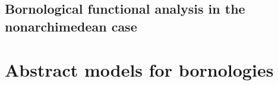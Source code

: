 

















\section{Bornological functional analysis in the nonarchimedean case}

\chapter{Abstract models for bornologies}

